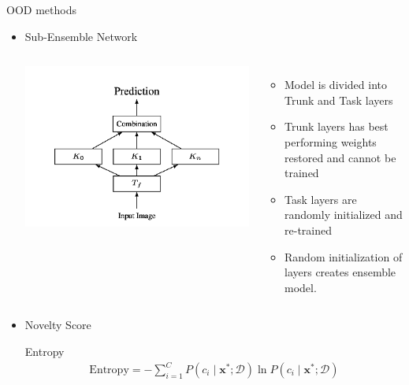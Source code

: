 \documentclass[10pt, aspectratio=169]{beamer}
\begin{document}
\begin{frame}[allowframebreaks]{OOD methods}
\begin{itemize}
\begin{itemize}
\begin{columns}
\begin{itemize}
                    \end{itemize}
            \end{columns} 
            \framebreak
            \item Sub-Ensemble Network 
            \begin{columns}
                   \centering
                   \includegraphics[scale=0.275]{images/subensembles.png}
                    \begin{itemize}
                        \item Model is divided into Trunk and Task layers
                        \item Trunk layers has best performing weights restored and cannot be trained
                        \item Task layers are randomly initialized and re-trained
                        \item Random initialization of layers creates ensemble model. 
                    \end{itemize}
            \end{columns} \newpage
            \item Novelty Score \newline
            
            Entropy
            \begin{equation}
                \label{Entropy}
                \begin{array}{l}
                    \text{Entropy} =-\sum_{i=1}^{C} P\left(c_i \mid \mathbf{x}^{*} ; \mathcal{D}\right) \ln P\left(c_i \mid \mathbf{x}^{*} ; \mathcal{D}\right) 
                \end{array}
            \end{equation} \newline


\end{itemize}
\end{itemize}
\end{frame}
\end{document}
